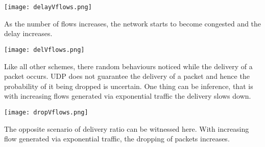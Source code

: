\documentclass{article}
\begin{document}
\begin{center}
    \texttt{[image: delayVflows.png]}
\end{center}

As the number of flows increases, the network starts to become congested and the delay increases.

\begin{center}
    \texttt{[image: delVflows.png]}
\end{center}

Like all other schemes, there random behaviours noticed while the delivery of a packet occurs. UDP does not guarantee the delivery of a packet and hence the probability of it being dropped is uncertain. One thing can be inference, that is with increasing flows generated via exponential traffic the delivery slows down.

\begin{center}
    \texttt{[image: dropVflows.png]}
\end{center}

The opposite scenario of delivery ratio can be witnessed here. With increasing flow generated via exponential traffic, the dropping of packets increases.
\end{document}
